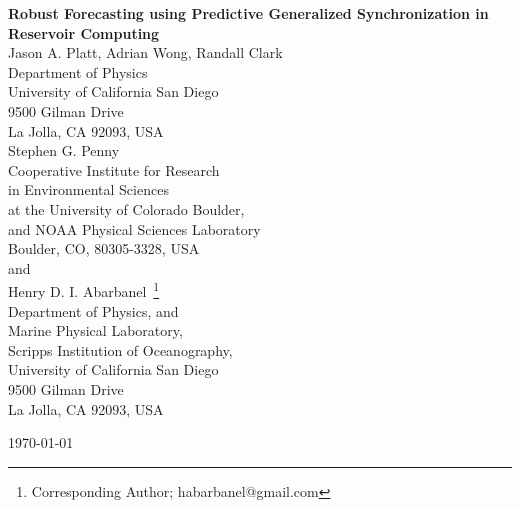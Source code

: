 \documentclass[12pt]{article}
\begin{document}
\begin{center}

{\large {\bf Robust Forecasting using Predictive Generalized Synchronization in Reservoir Computing}}\\
\bigskip
Jason A. Platt, Adrian Wong, Randall Clark\\
\bigskip
Department of Physics\\
University of California San Diego\\
9500 Gilman Drive\\
La Jolla, CA 92093, USA\\
\bigskip
Stephen G. Penny\\
Cooperative Institute for Research\\ in Environmental Sciences\\
at the University of Colorado Boulder,\\ and
NOAA Physical Sciences Laboratory\\
Boulder, CO, 80305-3328, USA \\
\bigskip
and\\
\bigskip
Henry D. I. Abarbanel~\footnote{Corresponding Author; habarbanel@gmail.com} \\
Department of Physics, and\\
Marine Physical Laboratory,\\
Scripps Institution of Oceanography,\\
University of California San Diego\\
9500 Gilman Drive\\
La Jolla, CA 92093, USA
\bigskip
\bigskip

\today

\end{center}
\newpage
\newpage
\end{document}

